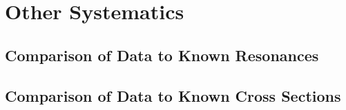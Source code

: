 \section{\label{sec:sys}Other Systematics}

\subsection{\label{sec:sys.cs}Comparison of Data to Known Resonances}

\FloatBarrier

\subsection{\label{sec:sys.cs}Comparison of Data to Known Cross Sections}

\FloatBarrier

